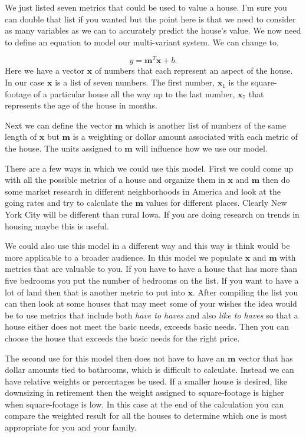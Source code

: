 We just listed seven metrics that could be used to value a house. I'm sure you can double that list if you wanted but the point here is that we need to consider as many variables as we can to accurately predict the house's value. We now need to define an equation to model our multi-variant system. We can change  to,

\begin{equation}
y = \mathbf{m}^T\mathbf{x} + b.
\end{equation}
\noindent
Here we have a vector $\mathbf{x}$ of numbers that each represent an aspect of the house. In our case $\mathbf{x}$ is a list of seven numbers. The first number, $\mathbf{x}_1$ is the square-footage of a particular house all the way up to the last number, $\mathbf{x}_7$ that represents the age of the house in months. 

Next we can define the vector $\mathbf{m}$ which is another list of numbers of the same length of $\mathbf{x}$ but $\mathbf{m}$ is a weighting or dollar amount associated with each metric of the house. The units assigned to $\mathbf{m}$ will influence how we use our model.

There are a few ways in which we could use this model. First we could come up with all the possible metrics of a house and organize them in $\mathbf{x}$ and $\mathbf{m}$ then do some market research in different neighborhoods in America and look at the going rates and try to calculate the $\mathbf{m}$ values for different places. Clearly New York City will be different than rural Iowa. If you are doing research on trends in housing maybe this is useful. 

We could also use this model in a different way and this way is think would be more applicable to a broader audience. In this model we populate $\mathbf{x}$ and $\mathbf{m}$ with metrics that are valuable to you. If you have to have a house that has more than five bedrooms you put the number of bedrooms on the list. If you want to have a lot of land then that is another metric to put into $\mathbf{x}$. After compiling the list you can then look at some houses that may meet some of your wishes the idea would be to use metrics that include both \emph{have to haves} and also \emph{like to haves} so that a house either does not meet the basic needs, exceeds basic needs. Then you can choose the house that exceeds the basic needs for the right price. 

The second use for this model then does not have to have an $\mathbf{m}$ vector that has dollar amounts tied to bathrooms, which is difficult to calculate. Instead we can have relative weights or percentages be used. If a smaller house is desired, like downsizing in retirement then the weight assigned to square-footage is higher when square-footage is low. In this case at the end of the calculation you can compare the weighted result for all the houses to determine which one is most appropriate for you and your family. 

